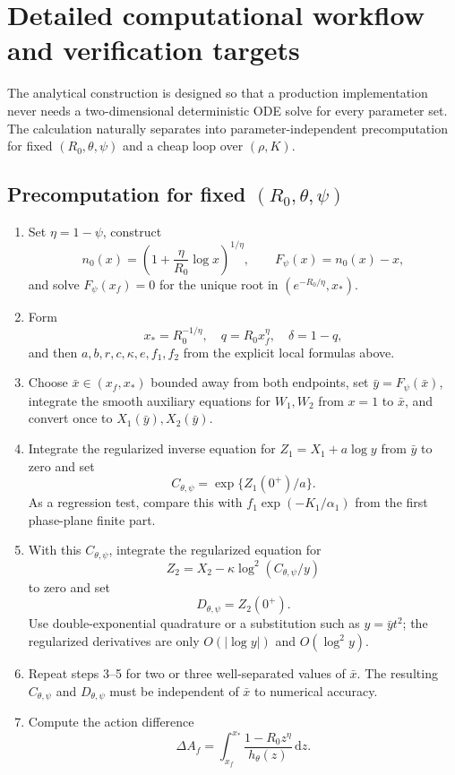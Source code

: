 \documentclass[11pt]{article}
\newcommand{\dd}{\,\mathrm{d}}
\begin{document}
\section{Detailed computational workflow and verification targets}
The analytical construction is designed so that a production implementation never needs a two-dimensional deterministic ODE solve for every parameter set. The calculation naturally separates into parameter-independent precomputation for fixed \((R_0,\theta,\psi)\) and a cheap loop over \((\rho,K)\).

\subsection{Precomputation for fixed \texorpdfstring{\((R_0,\theta,\psi)\)}{(R0,theta,psi)}}
\begin{enumerate}
\item Set \(\eta=1-\psi\), construct
\[
n_0(x)=\left(1+\frac\eta{R_0}\log x\right)^{1/\eta},
\qquad F_\psi(x)=n_0(x)-x,
\]
and solve \(F_\psi(x_f)=0\) for the unique root in \( (e^{-R_0/\eta},x_*)\).
\item Form
\[
x_*=R_0^{-1/\eta},\quad q=R_0x_f^\eta,\quad\delta=1-q,
\]
and then \(a,b,r,c,\kappa,e,f_1,f_2\) from the explicit local formulas above.
\item Choose \(\bar x\in(x_f,x_*)\) bounded away from both endpoints, set \(\bar y=F_\psi(\bar x)\), integrate the smooth auxiliary equations for \(W_1,W_2\) from \(x=1\) to \(\bar x\), and convert once to \(X_1(\bar y),X_2(\bar y)\).
\item Integrate the regularized inverse equation for \(Z_1=X_1+a\log y\) from \(\bar y\) to zero and set
\[
C_{\theta,\psi}=\exp\{Z_1(0^+)/a\}.
\]
As a regression test, compare this with \(f_1\exp(-K_1/\alpha_1)\) from the first phase-plane finite part.
\item With this \(C_{\theta,\psi}\), integrate the regularized equation for
\[
Z_2=X_2-\kappa\log^2(C_{\theta,\psi}/y)
\]
to zero and set
\[
D_{\theta,\psi}=Z_2(0^+).
\]
Use double-exponential quadrature or a substitution such as \(y=\bar y t^2\); the regularized derivatives are only \(O(|\log y|)\) and \(O(\log^2y)\).
\item Repeat steps 3--5 for two or three well-separated values of \(\bar x\).  The resulting \(C_{\theta,\psi}\) and \(D_{\theta,\psi}\) must be independent of \(\bar x\) to numerical accuracy.
\item Compute the action difference
\[
\Delta A_f=\int_{x_f}^{x_*}\frac{1-R_0z^\eta}{h_\theta(z)}\dd z.
\]
\end{enumerate}
\end{document}
